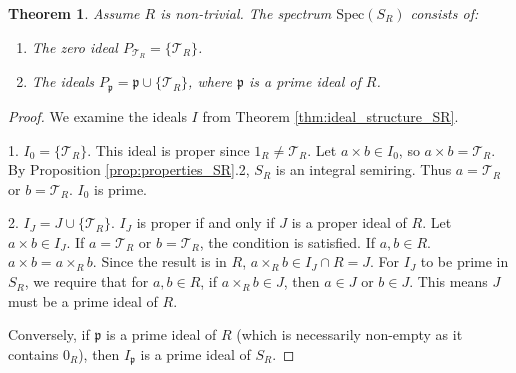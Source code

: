 \documentclass[11pt, a4paper]{article}
\theoremstyle{plain}
\newtheorem{theorem}{Theorem}[section]
\theoremstyle{definition}
\numberwithin{equation}{section}
\newcommand{\Tobj}{\mathcal{T}} %
\newcommand{\SR}{S_{R}}
\newcommand{\Spec}{\mathrm{Spec}}
\begin{document}
\begin{theorem}\label{thm:spectrum_SR}
Assume $R$ is non-trivial. The spectrum $\Spec(\SR)$ consists of:
\begin{enumerate}
    \item The zero ideal $P_{\Tobj_R} = \{\Tobj_R\}$.
    \item The ideals $P_{\mathfrak{p}} = \mathfrak{p} \cup \{\Tobj_R\}$, where $\mathfrak{p}$ is a prime ideal of $R$.
\end{enumerate}
\end{theorem}
\begin{proof}
We examine the ideals $I$ from Theorem \ref{thm:ideal_structure_SR}.

1. $I_0=\{\Tobj_R\}$. This ideal is proper since $1_R \neq \Tobj_R$. Let $a\times b \in I_0$, so $a\times b = \Tobj_R$. By Proposition \ref{prop:properties_SR}.2, $\SR$ is an integral semiring. Thus $a=\Tobj_R$ or $b=\Tobj_R$. $I_0$ is prime.

2. $I_J = J \cup \{\Tobj_R\}$. $I_J$ is proper if and only if $J$ is a proper ideal of $R$.
Let $a\times b \in I_J$. If $a=\Tobj_R$ or $b=\Tobj_R$, the condition is satisfied.
If $a, b \in R$. $a\times b = a\times_R b$. Since the result is in $R$, $a\times_R b \in I_J \cap R = J$.
For $I_J$ to be prime in $\SR$, we require that for $a, b \in R$, if $a\times_R b \in J$, then $a \in J$ or $b \in J$.
This means $J$ must be a prime ideal of $R$.

Conversely, if $\mathfrak{p}$ is a prime ideal of $R$ (which is necessarily non-empty as it contains $0_R$), then $I_{\mathfrak{p}}$ is a prime ideal of $\SR$.
\end{proof}
\end{document}
